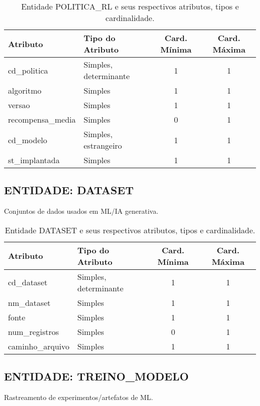 \documentclass[10pt,a4paper]{article}
\begin{document}
\begin{table}[h!]
\centering
\begin{tabular}{| l | l | c | c |}
\hline
\rowcolor{red}\color{white}\textbf{Atributo} & \color{white}\textbf{Tipo do Atributo} & \color{white}\textbf{Card. Mínima} & \color{white}\textbf{Card. Máxima} \\
\hline
cd\_politica & Simples, determinante & 1 & 1 \\
algoritmo & Simples & 1 & 1 \\
versao & Simples & 1 & 1 \\
recompensa\_media & Simples & 0 & 1 \\
cd\_modelo & Simples, estrangeiro & 1 & 1 \\
st\_implantada & Simples & 1 & 1 \\
\hline
\end{tabular}
\caption{Entidade POLITICA\_RL e seus respectivos atributos, tipos e cardinalidade.}
\label{tab:politica_rl}
\end{table}

\subsection*{ENTIDADE: DATASET}
Conjuntos de dados usados em ML/IA generativa.

\begin{table}[h!]
\centering
\begin{tabular}{| l | l | c | c |}
\hline
\rowcolor{red}\color{white}\textbf{Atributo} & \color{white}\textbf{Tipo do Atributo} & \color{white}\textbf{Card. Mínima} & \color{white}\textbf{Card. Máxima} \\
\hline
cd\_dataset & Simples, determinante & 1 & 1 \\
nm\_dataset & Simples & 1 & 1 \\
fonte & Simples & 1 & 1 \\
num\_registros & Simples & 0 & 1 \\
caminho\_arquivo & Simples & 1 & 1 \\
\hline
\end{tabular}
\caption{Entidade DATASET e seus respectivos atributos, tipos e cardinalidade.}
\label{tab:dataset}
\end{table}

\subsection*{ENTIDADE: TREINO\_MODELO}
Rastreamento de experimentos/artefatos de ML.
\end{document}
